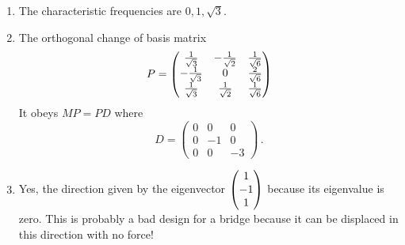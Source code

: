 \begin{enumerate}
\begin{enumerate}
For $\lambda=-1$
\[
M-(-1).I=\begin{pmatrix}0&-1&0\\-1&-1&-1\\0&-1&0\end{pmatrix}\sim\begin{pmatrix}1&0&1\\0&1&0\\0&0&0\end{pmatrix}
\, ,
\]
so $\colvec{-1\\0\\1}$ is an eigenvector.

For $\lambda=-3$
\[
M-(-3).I=\begin{pmatrix}2&-1&0\\-1&1&-1\\0&-1&2\end{pmatrix}\sim\begin{pmatrix}1&-1&1\\0&1&-2\\0&-1&2\end{pmatrix}
\sim\begin{pmatrix}1&0&-1\\0&1&-2\\0&0&0\end{pmatrix}\, ,
\]
so $\colvec{1\\2\\1}$ is an eigenvector.

\item The characteristic frequencies are $0,1,\sqrt{3}$.
\item The orthogonal change of basis matrix 
\[
P=\begin{pmatrix}
\frac1{\sqrt{3}}&-\frac1{\sqrt{2}}&\frac{1}{\sqrt{6}}\\
-\frac1{\sqrt{3}}&\mc 0&\frac{2}{\sqrt{6}}\\
\frac1{\sqrt{3}}&\frac1{\sqrt{2}}&\frac{1}{\sqrt{6}}
\end{pmatrix}
\]
It obeys $MP=PD$ where
\[
D=\begin{pmatrix}0&0&0\\0&-1&0\\0&0&-3\end{pmatrix}\, .
\]
\item Yes, the direction given by the eigenvector $\begin{pmatrix} 1\\-1\\1 \end{pmatrix}$ because its eigenvalue is zero. This is probably a bad design for a bridge because it can be displaced in this direction with no force!
\end{enumerate}


\end{enumerate}
